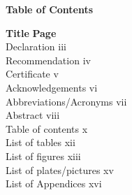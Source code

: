 \begin{titlepage}
    \thispagestyle{plain} %

    \begin{center}
        {\fontsize{14}{18}\selectfont \textbf{Table of Contents}}
    \end{center}

    \vspace*{48pt} 

    \noindent
    {\fontsize{12}{14}\selectfont \textbf{Title}} \hfill {\fontsize{12}{14}\selectfont \textbf{Page}} \\[10pt]

    \noindent Declaration \dotfill iii \\
    \noindent Recommendation \dotfill iv \\
    \noindent Certificate \dotfill v \\
    \noindent Acknowledgements \dotfill vi \\
    \noindent Abbreviations/Acronyms \dotfill vii \\
    \noindent Abstract \dotfill viii \\
    \noindent Table of contents \dotfill x \\
    \noindent List of tables \dotfill xii \\
    \noindent List of figures \dotfill xiii \\
    \noindent List of plates/pictures \dotfill xv \\
    \noindent List of Appendices \dotfill xvi \\[12pt]

    \makeatletter
    \makeatother

\end{titlepage}